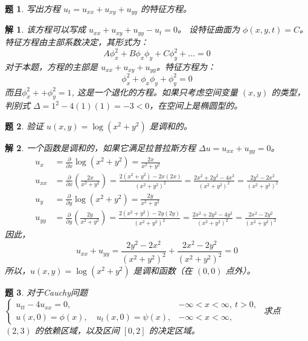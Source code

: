 \documentclass[12pt,a4paper]{article}
\newtheorem{problem}{题}
\newtheorem*{solution}{解}
\begin{document}
		\hrulefill
	\begin{problem}
		写出方程 $u_t = u_{xx} + u_{xy} + u_{yy}$ 的特征方程。
	\end{problem}
	\hrulefill
	\begin{solution}
		该方程可以写成 $u_{xx} + u_{xy} + u_{yy} - u_t = 0$。
		设特征曲面为 $\phi(x, y, t) = C$。特征方程由主部系数决定，其形式为：
		\[
		A \phi_x^2 + B \phi_x \phi_y + C \phi_y^2 + \dots = 0
		\]
		对于本题，方程的主部是 $u_{xx} + u_{xy} + u_{yy}$。特征方程为：
		\[
		\phi_x^2 + \phi_x \phi_y + \phi_y^2 = 0
		\]
		而且$	\phi_x^2 +  + \phi_y^2 = 1$,
		这是一个退化的方程。如果只考虑空间变量 $(x, y)$ 的类型，判别式 $\Delta = 1^2 - 4(1)(1) = -3 < 0$，在空间上是椭圆型的。
	\end{solution}
		\hrulefill
	\begin{problem}
		验证 $u(x, y) = \log(x^2 + y^2)$ 是调和的。
	\end{problem}
	\hrulefill
	\begin{solution}
		一个函数是调和的，如果它满足拉普拉斯方程 $\Delta u = u_{xx} + u_{yy} = 0$。
		\begin{align*}
			u_x &= \frac{\partial}{\partial x} \log(x^2+y^2) = \frac{2x}{x^2+y^2} \\
			u_{xx} &= \frac{\partial}{\partial x} \left( \frac{2x}{x^2+y^2} \right) = \frac{2(x^2+y^2) - 2x(2x)}{(x^2+y^2)^2} = \frac{2x^2+2y^2-4x^2}{(x^2+y^2)^2} = \frac{2y^2-2x^2}{(x^2+y^2)^2} \\
			u_y &= \frac{\partial}{\partial y} \log(x^2+y^2) = \frac{2y}{x^2+y^2} \\
			u_{yy} &= \frac{\partial}{\partial y} \left( \frac{2y}{x^2+y^2} \right) = \frac{2(x^2+y^2) - 2y(2y)}{(x^2+y^2)^2} = \frac{2x^2+2y^2-4y^2}{(x^2+y^2)^2} = \frac{2x^2-2y^2}{(x^2+y^2)^2}
		\end{align*}
		因此，
		\[
		u_{xx} + u_{yy} = \frac{2y^2-2x^2}{(x^2+y^2)^2} + \frac{2x^2-2y^2}{(x^2+y^2)^2} = 0
		\]
		所以，$u(x,y) = \log(x^2+y^2)$ 是调和函数（在 $(0,0)$ 点外）。
	\end{solution}
		\hrulefill
	\begin{problem}
		对于Cauchy问题 
		$
		\begin{cases}
			u_{tt} - 4u_{xx} = 0, & -\infty < x < \infty, \ t > 0, \\
			u(x, 0) = \phi(x), \quad u_t(x, 0) = \psi(x), & -\infty < x < \infty,
		\end{cases}
		$
		求点 $(2,3)$ 的依赖区域，以及区间 $[0, 2]$ 的决定区域。
	\end{problem}
	\hrulefill
\end{document}
